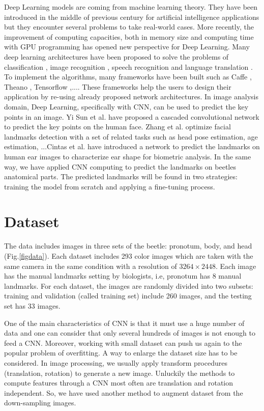 \documentclass[12pt,a4paper]{article}
\begin{document}
Deep Learning models are coming from machine learning theory. They have been introduced in the middle of previous century for artificial intelligence applications but they encounter
several problems to take real-world cases. More recently, the
improvement of computing capacities, both in memory size
and computing time with GPU programming has opened new
perspective for Deep Learning. Many deep learning architectures have been proposed to solve the problems of classification \cite{.}, image recognition \cite{.}, speech recognition \cite{.} and language translation \cite{.}. To implement
the algorithms, many frameworks have been built such as Caffe
\cite{.}, Theano \cite{.}, Tensorflow \cite{.},.... These frameworks help
the users to design their application by re-using already proposed network architectures. In image analysis domain, Deep
Learning, specifically with CNN, can be used to predict the key
points in an image. Yi Sun et al. \cite{.} have proposed a cascaded
convolutional network to predict the key points on the human
face. Zhang et al. \cite{.} optimize facial landmarks detection
with a set of related tasks such as head pose estimation, age
estimation, ...Cintas et al. \cite{.} have introduced a network to
predict the landmarks on human ear images to characterize ear
shape for biometric analysis. In the same way, we have applied CNN computing to predict the landmarks on beetles anatomical parts. The predicted landmarks will be found in two strategies: training the model from scratch and applying a fine-tuning process.
\section{Dataset}
The data includes images in three sets of the beetle: pronotum, body, and head (Fig.\ref{figdata}). Each dataset includes 293 color images which are taken with the same camera in the same
condition with a resolution of $3264 \times 2448$. Each image has
the manual landmarks setting by biologists, i.e, pronotum has $8$
manual landmarks. For each dataset, the images are randomly divided into two subsets: training and validation (called training set) include 260 images, and the testing set has 33 images.

One of the main characteristics of CNN is that it must use
a huge number of data and one can consider that only several
hundreds of images is not enough to feed a CNN. Moreover,
working with small dataset can push us again to the popular problem of overfitting. A way to enlarge the dataset size
has to be considered. In image processing, we usually apply
transform procedures (translation, rotation) to generate a new
image. Unluckily the methods to compute features through a
CNN most often are translation and rotation independent. So, we have used another method to augment dataset from the down-sampling images. 
\end{document}
